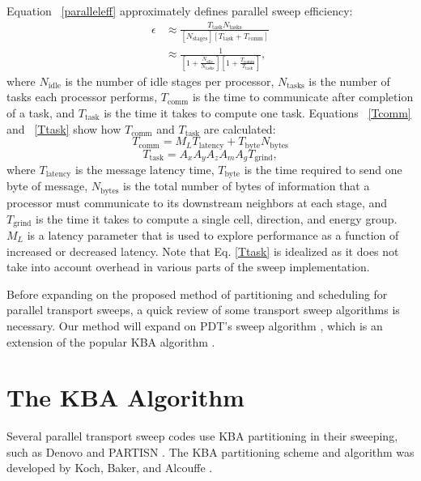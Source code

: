 Equation ~\eqref{paralleleff} approximately defines parallel sweep efficiency:
\begin{equation}\label{paralleleff}
\begin{split}
\epsilon &\approx \frac{T_{\text{task}} N_{\text{tasks}}}{[N_{\text{stages}}] [T_{\text{task}} + T_{\text{comm}}]} \\
            &\approx\frac{1}{[1+\frac{N_{\text{idle}}}{N_{\text{tasks}}}][1 + \frac{T_{\text{comm}}}{T_{\text{task}}}]},
\end{split}
\end{equation}
where $N_\text{idle}$ is the number of idle stages per processor, $N_\text{tasks}$ is the number of tasks each processor performs, $T_\text{comm}$ is the time to communicate after completion of a task, and $T_\text{task}$ is the time it takes to compute one task.
Equations ~\eqref{Tcomm} and ~\eqref{Ttask} show how $T_{\text{comm}}$ and $T_{\text{task}}$ are calculated:
\begin{equation}
T_{\text{comm}} = M_L T_{\text{latency}} + T_{\text{byte}} N_{\text{bytes}}
\label{Tcomm}
\end{equation}
\begin{equation}
T_{\text{task}} = A_x A_y A_z A_m A_g T_{\text{grind}},
\label{Ttask}
\end{equation}
where $T_{\text{latency}}$ is the message latency time, $T_{\text{byte}}$ is the time required to send one byte of message, $N_{\text{bytes}}$ is the total number of bytes of information that a processor must communicate to its downstream neighbors at each stage, and $T_{\text{grind}}$ is the time it takes to compute a single cell, direction, and energy group. $M_L$ is a latency parameter that is used to explore performance as a function of increased or decreased latency. Note that Eq. \ref{Ttask} is idealized as it does not take into account overhead in various parts of the sweep implementation.

Before expanding on the proposed method of partitioning and scheduling for parallel transport sweeps, a quick review of some transport sweep algorithms is necessary. Our method will expand on PDT's sweep algorithm \cite{mpadams2013}, which is an extension of the popular KBA algorithm \cite{KBA}.

\section{The KBA Algorithm}

Several parallel transport sweep codes use KBA partitioning in their sweeping, such as Denovo \cite{denovo} and PARTISN \cite{partisn}. The KBA partitioning scheme and algorithm was developed by Koch, Baker, and Alcouffe \cite{KBA}.


